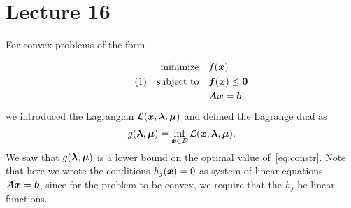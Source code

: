 %
%
% 


\chapter*{Lecture 16}
\setcounter{chapter}{16}
\setcounter{section}{0}
\setcounter{equation}{0}
\setcounter{theorem}{0}

For convex problems of the form

\begin{align*}\label{eq:constr}\tag{1}
\begin{split}
 \text{minimize}\quad & f(\bm{x})\\
 \quad\text{subject to}\quad & \bm{f}(\bm{x})\leq \bm{0}\\
         & \bm{A}\bm{x} = \bm{b},
\end{split}
\end{align*}
we introduced the Lagrangian $\mathcal{L}(\bm{x},\bm{\lambda},\bm{\mu})$ and defined the Lagrange dual as
\begin{equation*}
 g(\bm{\lambda},\bm{\mu})=\inf_{\bm{x}\in \mathcal{D}} \mathcal{L}(\bm{x},\bm{\lambda},\bm{\mu}).
\end{equation*}
We saw that $g(\bm{\lambda},\bm{\mu})$ is a lower bound on the optimal value of~\eqref{eq:constr}. Note that here we wrote the conditions $h_j(\bm{x})=0$ as system of linear equations $\bm{A}\bm{x}=\bm{b}$, since for the problem to be convex, we require that the $h_j$ be linear functions.

